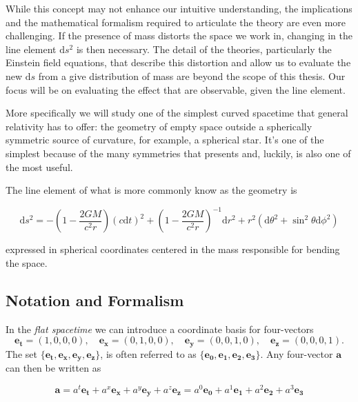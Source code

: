 While this concept may not enhance our intuitive understanding, the
implications and the mathematical formalism required to articulate the theory
are even more challenging.
If the presence of mass distorts the space we work in, changing in the line
element $\mathrm{d}s^2$ is then necessary.
The detail of the theories, particularly the Einstein field equations, that
describe this distortion and allow us to evaluate the new $\mathrm{d}s$ from a
give distribution of mass are beyond the scope of this thesis.
Our focus will be on evaluating the effect that are observable, given the line
element.

More specifically we will study one of the simplest curved spacetime that
general relativity has to offer: the geometry of empty space outside a
spherically symmetric source of curvature, for example, a spherical
star.
It's one of the simplest because of the many symmetries that presents and,
luckily, is also one of the most useful.

The line element of what is more commonly know as the \Sh geometry is

\begin{equation*}
    \mathrm{d}s^2 = - \left(1 - \frac{2 G M}{c^2 r} \right) (c \mathrm{d}t)^2
    + \left(1 - \frac{2 G M}{c^2 r} \right)^{-1} \mathrm{d}r^2
    + r^2 (\mathrm{d}\theta^2 + \sin^2 \theta \mathrm{d}\phi^2)
\end{equation*}

expressed in spherical coordinates centered in the mass responsible for bending
the space.




\newpage
\subsection{Notation and Formalism} \label{ssec:notation}

In the \textit{flat spacetime} we can introduce a coordinate basis for
four-vectors
\begin{equation}
    \mathbf{e_t} = (1,0,0,0), \quad
    \mathbf{e_x} = (0,1,0,0), \quad
    \mathbf{e_y} = (0,0,1,0), \quad
    \mathbf{e_z} = (0,0,0,1).
\end{equation}
The set 
$\{ \mathbf{e_t}, \mathbf{e_x}, \mathbf{e_y}, \mathbf{e_z} \}$, is often
referred to as $\{ \mathbf{e_0}, \mathbf{e_1}, \mathbf{e_2}, \mathbf{e_3} \}$.
Any four-vector $\textbf{a}$ can then be written as

\begin{equation}
    \textbf{a}
    = a^t \mathbf{e_t} + a^x \mathbf{e_x} + a^y \mathbf{e_y} + a^z \mathbf{e_z}
    = a^0 \mathbf{e_0} + a^1 \mathbf{e_1} + a^2 \mathbf{e_2} + a^3 \mathbf{e_3}
    \label{eq:a}
\end{equation}

